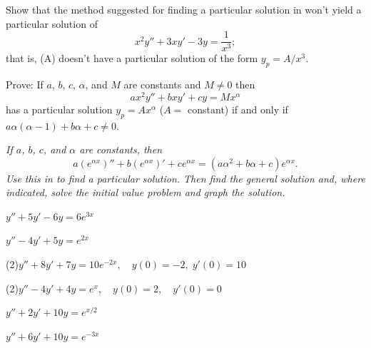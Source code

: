\begin{exerciselist}
\item\label{exer:5.3.14}Show that the method suggested for finding a particular
solution in 
won't yield a particular solution of
\[
x^2y''+3xy'-3y=\frac{1}{x^3};
\tag{A}
\]
that is,  (A) doesn't have a particular
solution of the form $y_p=A/x^3$.

\item\label{exer:5.3.15}Prove: If $a$, $b$, $c$, $\alpha$, and $M$ are constants and
$M\ne0$ then
\[
ax^2y''+bxy'+cy=M x^\alpha
\]
has a particular solution $y_p=Ax^\alpha$ ($A=$ constant)
 if and only if $a\alpha(\alpha-1)+b\alpha+c\ne0$.
\end{exerciselist}
%
\textsl{If $a$, $b$, $c$, and $\alpha$ are constants, then
\[
a(e^{\alpha x})''+b(e^{\alpha x})'+ce^{\alpha x}=(a\alpha^2+b\alpha+c)e^{\alpha
x}.
\]
Use this in  to find a
particular solution. Then find the general solution
and, where indicated, solve the initial value problem
and graph the solution.}

\begin{exerciselistTwoColumn}
\item\label{exer:5.3.16}$y''+5y'-6y=6e^{3x}$
\item\label{exer:5.3.17}$y''-4y'+5y=e^{2x}$

\item(2)\label{exer:5.3.18}\CGex $y''+8y'+7y=10e^{-2x}, \quad  y(0)=-2,\;
y'(0)=10$

\item(2)\label{exer:5.3.19}\CGex $y''-4y'+4y=e^{x}, \quad  y(0)=2,\quad y'(0)=0$

\item\label{exer:5.3.20}$y''+2y'+10y=e^{x/2}$
\item\label{exer:5.3.21}$y''+6y'+10y=e^{-3x}$

\end{exerciselistTwoColumn}

